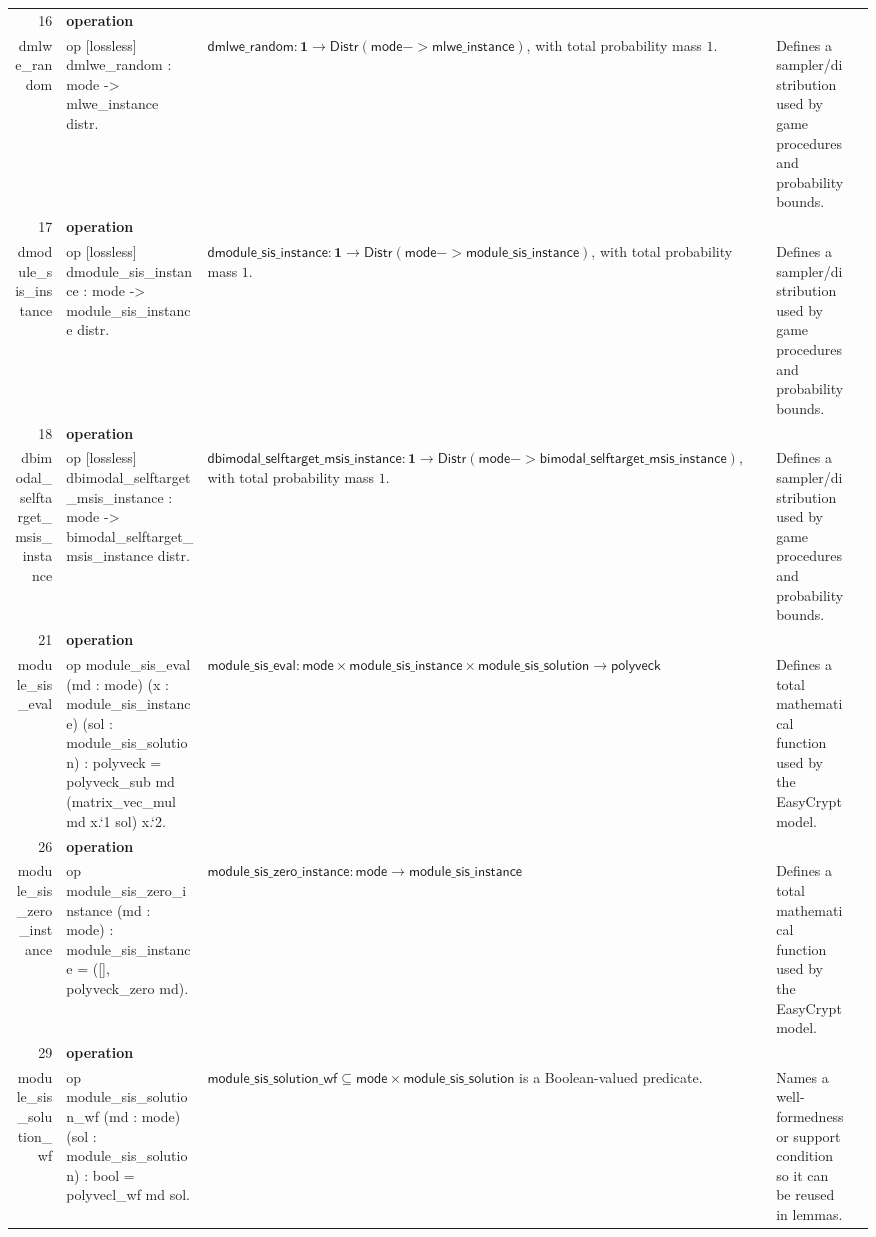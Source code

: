 \documentclass[10pt]{article}
\newcommand{\ec}[1]{\begingroup\ttfamily\scriptsize #1\endgroup}
\begin{document}
\begin{longtable}{r L{0.17\textwidth} L{0.26\textwidth} L{0.27\textwidth} L{0.20\textwidth}}
16 & \textbf{operation}\\\ec{dmlwe\_random} & \ec{op [lossless] dmlwe\_random : mode -> mlwe\_instance distr.} & \(\mathsf{dmlwe\_random} : \mathbf{1} \to \mathsf{Distr}(\mathsf{mode -> mlwe\_instance})\), with total probability mass \(1\). & Defines a sampler/distribution used by game procedures and probability bounds. \\
17 & \textbf{operation}\\\ec{dmodule\_sis\_instance} & \ec{op [lossless] dmodule\_sis\_instance : mode -> module\_sis\_instance distr.} & \(\mathsf{dmodule\_sis\_instance} : \mathbf{1} \to \mathsf{Distr}(\mathsf{mode -> module\_sis\_instance})\), with total probability mass \(1\). & Defines a sampler/distribution used by game procedures and probability bounds. \\
18 & \textbf{operation}\\\ec{dbimodal\_selftarget\_msis\_instance} & \ec{op [lossless] dbimodal\_selftarget\_msis\_instance : mode -> bimodal\_selftarget\_msis\_instance distr.} & \(\mathsf{dbimodal\_selftarget\_msis\_instance} : \mathbf{1} \to \mathsf{Distr}(\mathsf{mode -> bimodal\_selftarget\_msis\_instance})\), with total probability mass \(1\). & Defines a sampler/distribution used by game procedures and probability bounds. \\
21 & \textbf{operation}\\\ec{module\_sis\_eval} & \ec{op module\_sis\_eval (md : mode) (x : module\_sis\_instance) (sol : module\_sis\_solution) : polyveck = polyveck\_sub md (matrix\_vec\_mul md x.`1 sol) x.`2.} & \(\mathsf{module\_sis\_eval} : \mathsf{mode} \times \mathsf{module\_sis\_instance} \times \mathsf{module\_sis\_solution} \to \mathsf{polyveck}\) & Defines a total mathematical function used by the EasyCrypt model. \\
26 & \textbf{operation}\\\ec{module\_sis\_zero\_instance} & \ec{op module\_sis\_zero\_instance (md : mode) : module\_sis\_instance = ([], polyveck\_zero md).} & \(\mathsf{module\_sis\_zero\_instance} : \mathsf{mode} \to \mathsf{module\_sis\_instance}\) & Defines a total mathematical function used by the EasyCrypt model. \\
29 & \textbf{operation}\\\ec{module\_sis\_solution\_wf} & \ec{op module\_sis\_solution\_wf (md : mode) (sol : module\_sis\_solution) : bool = polyvecl\_wf md sol.} & \(\mathsf{module\_sis\_solution\_wf} \subseteq \mathsf{mode} \times \mathsf{module\_sis\_solution}\) is a Boolean-valued predicate. & Names a well-formedness or support condition so it can be reused in lemmas. \\

\end{longtable}
\end{document}
